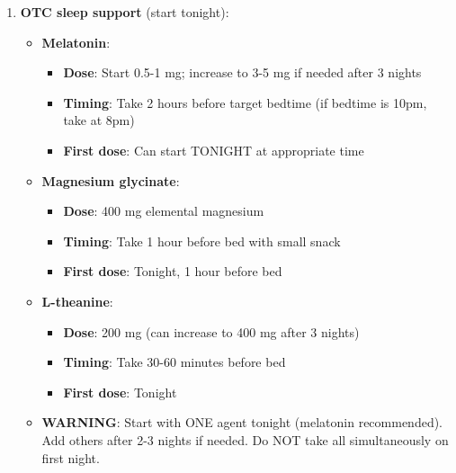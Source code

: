 \begin{enumerate}
    \item \textbf{OTC sleep support} (start tonight):
    \begin{itemize}
        \item \textbf{Melatonin}:
        \begin{itemize}
            \item \textbf{Dose}: Start 0.5-1 mg; increase to 3-5 mg if needed after 3 nights
            \item \textbf{Timing}: Take 2 hours before target bedtime (if bedtime is 10pm, take at 8pm)
            \item \textbf{First dose}: Can start TONIGHT at appropriate time
        \end{itemize}
        \item \textbf{Magnesium glycinate}:
        \begin{itemize}
            \item \textbf{Dose}: 400 mg elemental magnesium
            \item \textbf{Timing}: Take 1 hour before bed with small snack
            \item \textbf{First dose}: Tonight, 1 hour before bed
        \end{itemize}
        \item \textbf{L-theanine}:
        \begin{itemize}
            \item \textbf{Dose}: 200 mg (can increase to 400 mg after 3 nights)
            \item \textbf{Timing}: Take 30-60 minutes before bed
            \item \textbf{First dose}: Tonight
        \end{itemize}
        \item \textbf{WARNING}: Start with ONE agent tonight (melatonin recommended). Add others after 2-3 nights if needed. Do NOT take all simultaneously on first night.
    \end{itemize}


\end{enumerate}

